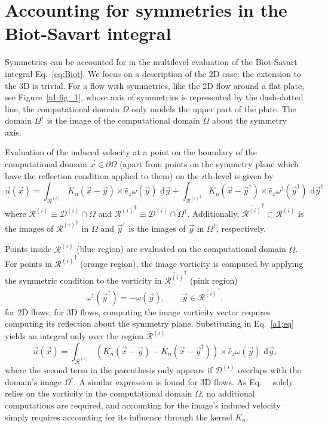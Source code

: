 \documentclass[final,1p,times]{elsarticle}
\begin{document}
\section{Accounting for symmetries in the Biot-Savart integral}
\label{A1}

Symmetries can be accounted for in the multilevel evaluation of the Biot-Savart integral Eq.~\ref{eq:Biot}. We focus on a description of the 2D case; the extension to the 3D is trivial. For a flow with symmetries, like the 2D flow around a flat plate, see Figure~\ref{a1:fig_1}, whose axis of symmetries is represented by the dash-dotted line, the computational domain $\Omega$ only models the upper part of the plate. The domain $\Omega^\dagger$ is the image of the computational domain $\Omega$ about the symmetry axis.

Evaluation of the induced velocity at a point on the boundary of the computational domain $\vec{x}\in\partial\Omega$ (apart from points on the symmetry plane which have the reflection condition applied to them) on the $i$th-level is given by
\begin{equation}\label{a1;eq}
     {\vec u}({\vec x}) = \int_{\mathcal{R}^{(i)}} K_{n}({\vec x} - \vec{y})\times \hat{e}_z\omega({\vec y})\text{ d}\vec{y} + \int_{{\mathcal{R}^{(i)}}^\dagger} K_{n}({\vec x} - \vec{y}^\dagger)\times \hat{e}_z\omega^\dagger({\vec y}^\dagger)\text{ d}\vec{y}^\dagger
\end{equation}
where $\mathcal{R}^{(i)}\equiv\mathcal{D}^{(i)}\cap\Omega$ and ${\mathcal{R}^{(i)}}^\dagger\equiv\mathcal{D}^{(i)}\cap\Omega^\dagger$. Additionally, $\overline{\mathcal{R}^{(i)}}^\dagger\subset\mathcal{R}^{(i)}$ is the images of ${\mathcal{R}^{(i)}}^\dagger$ in $\Omega$ and ${\vec{y}}^\dagger$ is the images of $\vec{y}$ in $\Omega^\dagger$, respectively.

Points inside ${\mathcal{R}^{(i)}}$ (blue region) are evaluated on the computational domain $\Omega$. For points in ${\mathcal{R}^{(i)}}^\dagger$ (orange region), the image vorticity is computed by applying the symmetric condition to the vorticity in $\overline{\mathcal{R}^{(i)}}^\dagger$ (pink region)
\begin{equation}
    \omega^\dagger(\vec{y}^\dagger) = -\omega(\vec{y}), \quad\quad \vec{y}\in\overline{\mathcal{R}^{(i)}}^\dagger,
\end{equation}
for 2D flows; for 3D flows, computing the image vorticity vector requires computing its reflection about the symmetry plane. Substituting in Eq.~\ref{a1;eq} yields an integral only over the region $\mathcal{R}^{(i)}$
\begin{equation}
     {\vec u}({\vec x}) = \int_{\mathcal{R}^{(i)}} \left(K_{n}({\vec x} - \vec{y})-K_{n}({\vec x} - \vec{y}^\dagger)\right)\times \hat{e}_z\omega({\vec y})\text{ d}\vec{y},
\end{equation}
where the second term in the parenthesis only appears if $\mathcal{D}^{(i)}$ overlaps with the domain's image $\Omega^\dagger$. A similar expression is found for 3D flows. As Eq.~\theequation~ solely relies on the vorticity in the computational domain $\Omega$, no additional computations are required, and accounting for the image's induced velocity simply requires accounting for its influence through the kernel $K_n$.
\end{document}
